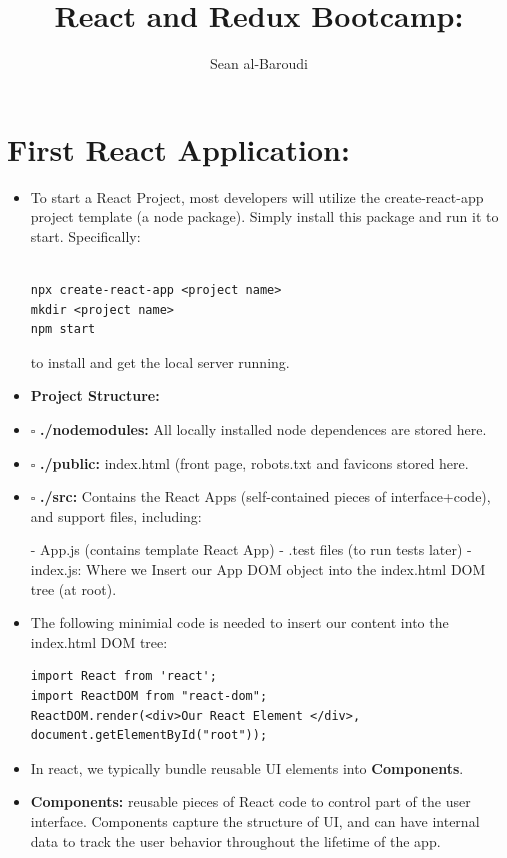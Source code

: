 \documentclass[8pt,a4paper]{extarticle}
\title{React and Redux Bootcamp:}
\author{Sean al-Baroudi}
\begin{document}
\newcommand{\mitem}{\item[$\square$]}
\newcommand{\mmitem}{\item[$\triangledown$]}

\maketitle


\section*{First React Application:}

\begin{itemize}
\item To start a React Project, most developers will utilize the create-react-app project template (a node package). Simply install this package and run it to start.
Specifically:

\begin{verbatim}

npx create-react-app <project name>
mkdir <project name>
npm start

\end{verbatim}

to install and get the local server running.

\item \textbf{Project Structure:}
\mitem \textbf{./nodemodules:} All locally installed node dependences are stored here.
\mitem \textbf{./public:} index.html (front page, robots.txt and favicons stored here.
\mitem \textbf{./src:} Contains the React Apps (self-contained pieces of interface+code), and support files, including:

- App.js (contains template React App)
- .test files (to run tests later)
- index.js: Where we Insert our App DOM object into the index.html DOM tree (at root).

\item The following minimial code is needed to insert our content into the index.html DOM tree:

\begin{verbatim}
import React from 'react';
import ReactDOM from "react-dom";
ReactDOM.render(<div>Our React Element </div>, 
document.getElementById("root"));
\end{verbatim}

\item In react, we typically bundle reusable UI elements into \textbf{Components}. 
\item \textbf{Components:} reusable pieces of React code to control part of the user interface. Components capture the structure of UI, and can have internal data to track the user behavior throughout the lifetime of the app.


\end{itemize}
\end{document}
